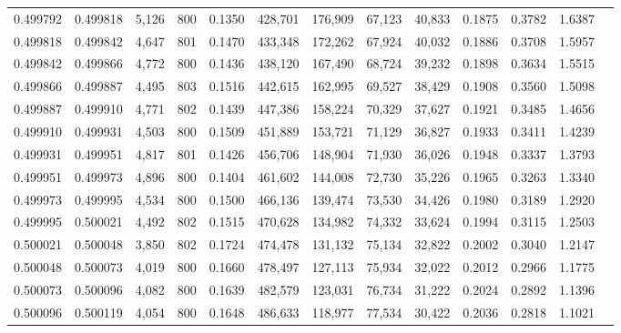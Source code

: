 \begin{tabular}{rrrrrrrrrrrrr}
0.499792 & 0.499818 & 5,126 & 800 &                                     0.1350 & 428,701 & 176,909 &  67,123 &  40,833 & 0.1875 & 0.3782 & 1.6387 \\
0.499818 & 0.499842 & 4,647 & 801 &                                     0.1470 & 433,348 & 172,262 &  67,924 &  40,032 & 0.1886 & 0.3708 & 1.5957 \\
0.499842 & 0.499866 & 4,772 & 800 &                                     0.1436 & 438,120 & 167,490 &  68,724 &  39,232 & 0.1898 & 0.3634 & 1.5515 \\
0.499866 & 0.499887 & 4,495 & 803 &                                     0.1516 & 442,615 & 162,995 &  69,527 &  38,429 & 0.1908 & 0.3560 & 1.5098 \\
0.499887 & 0.499910 & 4,771 & 802 &                                     0.1439 & 447,386 & 158,224 &  70,329 &  37,627 & 0.1921 & 0.3485 & 1.4656 \\
0.499910 & 0.499931 & 4,503 & 800 &                                     0.1509 & 451,889 & 153,721 &  71,129 &  36,827 & 0.1933 & 0.3411 & 1.4239 \\
0.499931 & 0.499951 & 4,817 & 801 &                                     0.1426 & 456,706 & 148,904 &  71,930 &  36,026 & 0.1948 & 0.3337 & 1.3793 \\
0.499951 & 0.499973 & 4,896 & 800 &                                     0.1404 & 461,602 & 144,008 &  72,730 &  35,226 & 0.1965 & 0.3263 & 1.3340 \\
0.499973 & 0.499995 & 4,534 & 800 &                                     0.1500 & 466,136 & 139,474 &  73,530 &  34,426 & 0.1980 & 0.3189 & 1.2920 \\
0.499995 & 0.500021 & 4,492 & 802 &                                     0.1515 & 470,628 & 134,982 &  74,332 &  33,624 & 0.1994 & 0.3115 & 1.2503 \\
0.500021 & 0.500048 & 3,850 & 802 &                                     0.1724 & 474,478 & 131,132 &  75,134 &  32,822 & 0.2002 & 0.3040 & 1.2147 \\
0.500048 & 0.500073 & 4,019 & 800 &                                     0.1660 & 478,497 & 127,113 &  75,934 &  32,022 & 0.2012 & 0.2966 & 1.1775 \\
0.500073 & 0.500096 & 4,082 & 800 &                                     0.1639 & 482,579 & 123,031 &  76,734 &  31,222 & 0.2024 & 0.2892 & 1.1396 \\
0.500096 & 0.500119 & 4,054 & 800 &                                     0.1648 & 486,633 & 118,977 &  77,534 &  30,422 & 0.2036 & 0.2818 & 1.1021 \\

\end{tabular}
